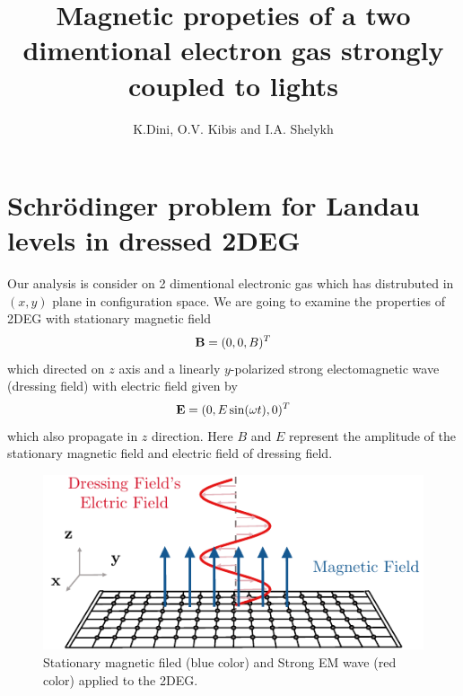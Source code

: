 \documentclass[a4paper]{article}
\title{Magnetic propeties of a two dimentional electron gas strongly coupled to lights}
\author{K.Dini, O.V. Kibis and I.A. Shelykh}
\numberwithin{equation}{subsection}
\numberwithin{equation}{section}
\begin{document}
\maketitle

\section{Schrödinger problem for Landau levels in dressed 2DEG}

Our analysis is consider on 2 dimentional electronic gas which has distrubuted in $(x,y)$ plane in configuration space. We are going to examine the properties of 2DEG with stationary magnetic field
\begin{equation} \label{1.1}
  \vb{B} = (0,0,B)^T
\end{equation}
which directed on $z$ axis and a linearly $y$-polarized strong electomagnetic wave (dressing field) with electric field given by
\begin{equation} \label{1.2}
  \vb{E} = (0,E\sin(\omega t),0)^T
\end{equation}
which also propagate in $z$ direction. Here $B$ and $E$ represent the amplitude of the stationary magnetic field and electric field of dressing field.
\begin{figure}[ht!]
  \centering
  \includegraphics[scale=0.9]{figures/fig1.pdf}
  \caption{Stationary magnetic filed (blue color) and Strong EM wave (red color) applied to the 2DEG.}
  \label{fig:1.1}
\end{figure}
\end{document}
